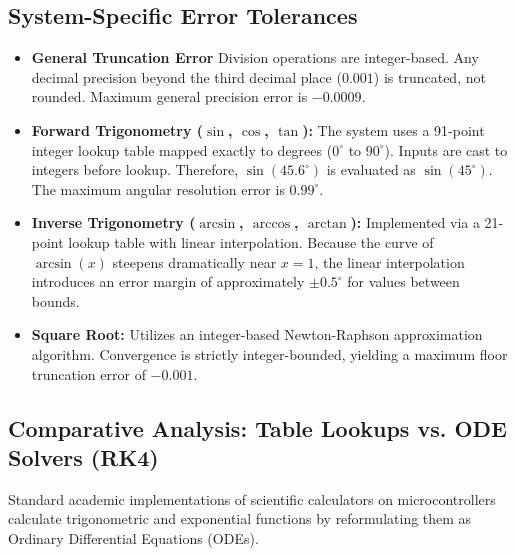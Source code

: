 \documentclass[conference]{IEEEtran}
\begin{document}
\subsection{System-Specific Error Tolerances}
\begin{itemize}
    \item \textbf{General Truncation Error} Division operations are integer-based. Any decimal precision beyond the third decimal place ($0.001$) is truncated, not rounded. Maximum general precision error is $-0.0009$.
    \item \textbf{Forward Trigonometry ($\sin$, $\cos$, $\tan$):} The system uses a 91-point integer lookup table mapped exactly to degrees ($0^\circ$ to $90^\circ$). Inputs are cast to integers before lookup. Therefore, $\sin(45.6^\circ)$ is evaluated as $\sin(45^\circ)$. The maximum angular resolution error is $0.99^\circ$.
    \item \textbf{Inverse Trigonometry ($\arcsin$, $\arccos$, $\arctan$):} Implemented via a 21-point lookup table with linear interpolation. Because the curve of $\arcsin(x)$ steepens dramatically near $x = 1$, the linear interpolation introduces an error margin of approximately $\pm 0.5^\circ$ for values between bounds.
    \item \textbf{Square Root:} Utilizes an integer-based Newton-Raphson approximation algorithm. Convergence is strictly integer-bounded, yielding a maximum floor truncation error of $-0.001$.
\end{itemize}

\subsection{Comparative Analysis: Table Lookups vs. ODE Solvers (RK4)}
Standard academic implementations of scientific calculators on microcontrollers calculate trigonometric and exponential functions by reformulating them as Ordinary Differential Equations (ODEs).
\end{document}
